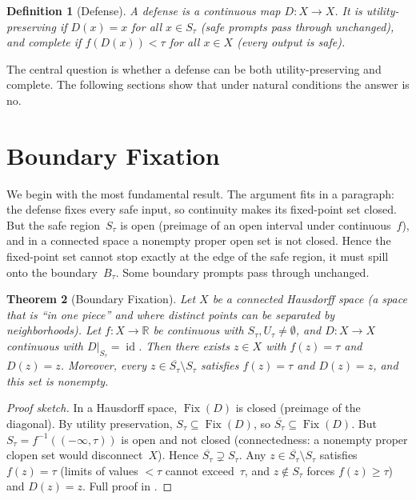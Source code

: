 \documentclass[11pt]{article}
\newtheorem{theorem}{Theorem}[section]
\newtheorem{definition}[theorem]{Definition}
\newcommand{\R}{\mathbb{R}}
\newcommand{\cl}[1]{\overline{#1}}
\newcommand{\Fix}{\operatorname{Fix}}
\newcommand{\id}{\operatorname{id}}
\begin{document}
\begin{definition}[Defense]
\label{def:defense}
A \emph{defense} is a continuous map $D\colon X \to X$. It is
\emph{utility-preserving} if $D(x) = x$ for all $x \in S_\tau$
(safe prompts pass through unchanged),
and \emph{complete} if $f(D(x)) < \tau$ for all $x\in X$
(every output is safe).
\end{definition}

The central question is whether a defense can be both
utility-preserving and complete. The following sections show that under
natural conditions the answer is no.


\section{Boundary Fixation}
\label{sec:boundary}

We begin with the most fundamental result. The argument fits in a
paragraph: the defense fixes every safe input, so continuity makes its
fixed-point set closed. But the safe region~$S_\tau$ is open (preimage
of an open interval under continuous~$f$), and in a connected space a
nonempty proper open set is not closed. Hence the fixed-point set
cannot stop exactly at the edge of the safe region, it must spill onto
the boundary~$B_\tau$. Some boundary prompts pass through unchanged.

\begin{theorem}[Boundary Fixation]
\label{thm:main}
Let $X$ be a connected Hausdorff space (a space that is ``in one
piece'' and where distinct points can be separated by neighborhoods).
Let $f\colon X\to\R$ be continuous with $S_\tau, U_\tau \neq
\emptyset$, and $D\colon X \to X$ continuous with
$D|_{S_\tau} = \id$. Then there exists $z\in X$ with $f(z) = \tau$
and $D(z) = z$. Moreover, every $z \in \cl{S_\tau} \setminus S_\tau$
satisfies $f(z) = \tau$ and $D(z) = z$, and this set is nonempty.
\end{theorem}

\begin{proof}[Proof sketch]
In a Hausdorff space, $\Fix(D)$ is closed (preimage of the diagonal).
By utility preservation, $S_\tau \subseteq \Fix(D)$, so
$\cl{S_\tau} \subseteq \Fix(D)$. But $S_\tau = f^{-1}((-\infty,\tau))$
is open and not closed (connectedness: a nonempty proper clopen set
would disconnect~$X$). Hence $\cl{S_\tau} \supsetneq S_\tau$. Any
$z \in \cl{S_\tau}\setminus S_\tau$ satisfies $f(z) = \tau$ (limits of
values ${<}\tau$ cannot exceed~$\tau$, and $z \notin S_\tau$ forces
$f(z) \geq \tau$) and $D(z) = z$. Full proof in .
\end{proof}
\end{document}
